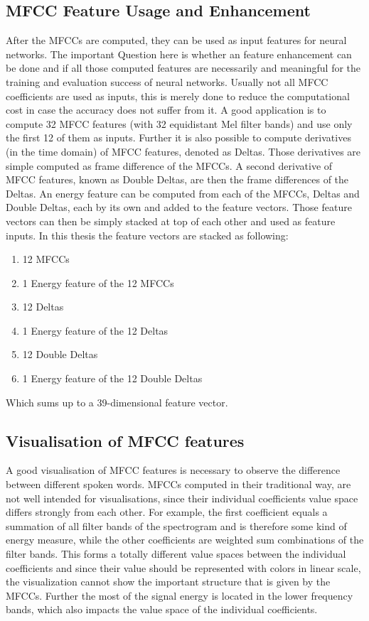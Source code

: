 \subsection{MFCC Feature Usage and Enhancement}
After the MFCCs are computed, they can be used as input features for neural networks. 
The important Question here is whether an feature enhancement can be done and if all those computed features are necessarily and meaningful for the training and evaluation success of neural networks. Usually not all MFCC coefficients are used as inputs, this is merely done to reduce the computational cost in case the accuracy does not suffer from it.
A good application is to compute 32 MFCC features (with 32 equidistant Mel filter bands) and use only the first 12 of them as inputs.
Further it is also possible to compute derivatives (in the time domain) of MFCC features, denoted as Deltas. 
Those derivatives are simple computed as frame difference of the MFCCs.
A second derivative of MFCC features, known as Double Deltas, are then the frame differences of the Deltas.
An energy feature can be computed from each of the MFCCs, Deltas and Double Deltas, each by its own and added to the feature vectors.
Those feature vectors can then be simply stacked at top of each other and used as feature inputs.
In this thesis the feature vectors are stacked as following:
\begin{enumerate}
    \item 12 MFCCs
    \item 1 Energy feature of the 12 MFCCs
    \item 12 Deltas
    \item 1 Energy feature of the 12 Deltas
    \item 12 Double Deltas
    \item 1 Energy feature of the 12 Double Deltas
\end{enumerate}
Which sums up to a 39-dimensional feature vector.

\subsection{Visualisation of MFCC features}
A good visualisation of MFCC features is necessary to observe the difference between different spoken words.
MFCCs computed in their traditional way, are not well intended for visualisations, since their individual coefficients value space differs strongly from each other.
For example, the first coefficient equals a summation of all filter bands of the spectrogram and is therefore some kind of energy measure, while the other coefficients are weighted sum combinations of the filter bands.
This forms a totally different value spaces between the individual coefficients and since their value should be represented with colors in linear scale, the visualization cannot show the important structure that is given by the MFCCs.
Further the most of the signal energy is located in the lower frequency bands, which also impacts the value space of the individual coefficients.

